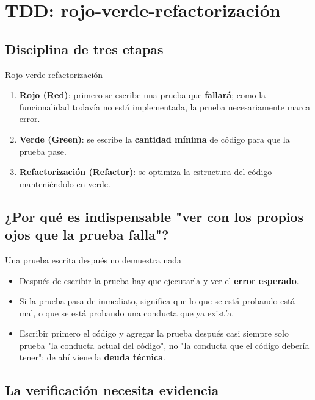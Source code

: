 \section{TDD: rojo-verde-refactorización}

\subsection{Disciplina de tres etapas}

\begin{importantbox}{Rojo-verde-refactorización}
\begin{enumerate}
    \item \textbf{Rojo (Red)}: primero se escribe una prueba que \textbf{fallará}; como la funcionalidad todavía no está implementada, la prueba necesariamente marca error.
    \item \textbf{Verde (Green)}: se escribe la \textbf{cantidad mínima} de código para que la prueba pase.
    \item \textbf{Refactorización (Refactor)}: se optimiza la estructura del código manteniéndolo en verde.
\end{enumerate}
\end{importantbox}

\subsection{¿Por qué es indispensable "ver con los propios ojos que la prueba falla"?}

\begin{warningbox}{Una prueba escrita después no demuestra nada}
\begin{itemize}
    \item Después de escribir la prueba hay que ejecutarla y ver el \textbf{error esperado}.
    \item Si la prueba pasa de inmediato, significa que lo que se está probando está mal, o que se está probando una conducta que ya existía.
    \item Escribir primero el código y agregar la prueba después casi siempre solo prueba "la conducta actual del código", no "la conducta que el código debería tener"; de ahí viene la \textbf{deuda técnica}.
\end{itemize}
\end{warningbox}

\subsection{La verificación necesita evidencia}

